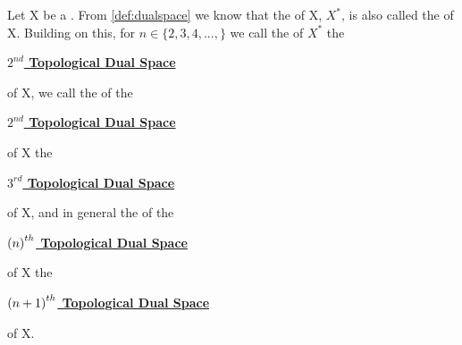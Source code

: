 \label{def:higherorderdualspaces}
\newcommand{\SecondTopDualSpace}[0]{ 
    \bf \hyperref[def:higherorderdualspaces]{$2^{nd}$ Topological Dual Space} \rm 
}
\newcommand{\ThirdTopDualSpace}[0]{ 
    \bf \hyperref[def:higherorderdualspaces]{$3^{rd}$ Topological Dual Space} \rm 
}
\newcommand{\NthTopDualSpace}[1]{
    \bf \hyperref[def:higherorderdualspaces]{$\pa{#1}^{th}$ Topological Dual Space} \rm
}
\begin{df}
    Let X be a 
   \SeminormedSpace. 
    From 
    \ref{def:dualspace}
    we know that the 
    \TopDualSpace
    of X, 
    $X^*$, 
    is also called the 
    \FirstTopDualSpace
    of X. 
    Building on this, 
    for $n \in \{2, 3, 4, ..., \}$
    we call the 
    \FirstTopDualSpace
    of $X^*$ the 
    \SecondTopDualSpace
    of X, 
    we call the 
    \FirstTopDualSpace
    of the 
    \SecondTopDualSpace
    of X the 
    \ThirdTopDualSpace
    of X, and 
    in general the 
    \FirstTopDualSpace
    of the 
    \NthTopDualSpace{n}
    of X
    the 
    \NthTopDualSpace{n+1}
    of X. 
\end{df}
